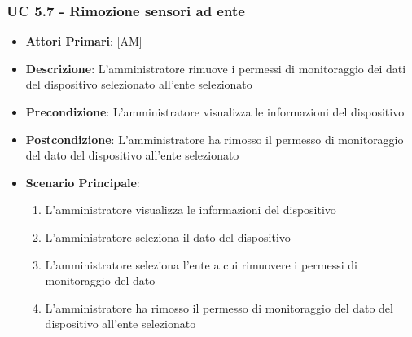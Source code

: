 			\subsubsection{UC 5.7 - Rimozione sensori ad ente}
			\begin{itemize}
				\item \textbf{Attori Primari}: [AM]
				\item \textbf{Descrizione}: L'amministratore rimuove i permessi di monitoraggio dei dati del dispositivo selezionato all'ente selezionato
				\item \textbf{Precondizione}: L'amministratore visualizza le informazioni del dispositivo
				\item \textbf{Postcondizione}: L'amministratore ha rimosso il permesso di monitoraggio del dato del dispositivo all'ente selezionato
				\item \textbf{Scenario Principale}:
				\begin{enumerate}
					\item{L'amministratore visualizza le informazioni del dispositivo}
					\item{L'amministratore seleziona il dato del dispositivo}
					\item{L'amministratore seleziona l'ente a cui rimuovere i permessi di monitoraggio del dato}
					\item{L'amministratore ha rimosso il permesso di monitoraggio del dato del dispositivo all'ente selezionato}
				\end{enumerate}
			\end{itemize}